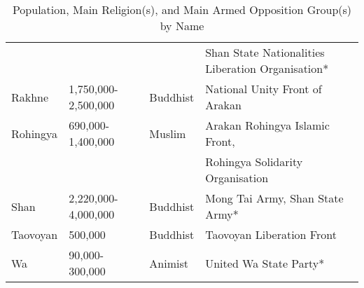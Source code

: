 \documentclass{article}
\begin{document}
\begin{table}[htbp]
\begin{tabular}{@{}lllp{5.5cm}@{}}
        &                     &                    & Shan State Nationalities Liberation Organisation* \\
Rakhne  & 1,750,000-2,500,000 & Buddhist           & National Unity Front of Arakan \\
Rohingya& 690,000-1,400,000   & Muslim             & Arakan Rohingya Islamic Front, \\
        &                     &                    & Rohingya Solidarity Organisation \\
Shan    & 2,220,000-4,000,000 & Buddhist           & Mong Tai Army, Shan State Army* \\
Taovoyan& 500,000             & Buddhist           & Taovoyan Liberation Front \\
Wa      & 90,000-300,000      & Animist            & United Wa State Party* \\
\bottomrule
\end{tabular}
\caption{Population, Main Religion(s), and Main Armed Opposition Group(s) by Name}
\end{table}


\printbibliography{}
\end{document}

